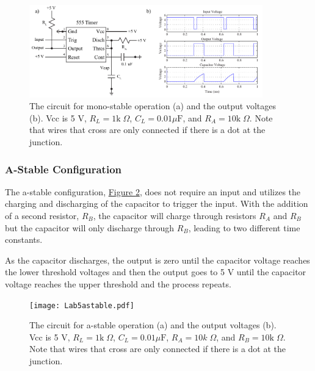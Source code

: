 \begin{figure}
	\centering
		\includegraphics[width=0.9\textwidth]{Lab5monostable.pdf}
	\caption{The circuit for mono-stable operation (a) and the output voltages (b). Vcc is 5 V, $R_L = 1\mathrm{k}\; \Omega$, $C_L = 0.01\mu \mathrm{F}$, and $R_A = 10\mathrm{k}\;\Omega$. Note that wires that cross are only connected if there is a dot at the junction.} \label{fig:monostable}
\end{figure}



\subsubsection{A-Stable Configuration}

The a-stable configuration, \hyperref[fig:astable]{Figure \ref*{fig:astable}}, does not require an input  and utilizes the charging and discharging of the capacitor to trigger the input. With the addition of a second resistor, $R_B$, the capacitor will charge through resistors $R_A$ and $R_B$ but the capacitor will only discharge through $R_B$, leading to two different time constants. 

As the capacitor discharges, the output is zero until the capacitor voltage reaches the lower threshold voltages and then the output goes to 5 V until the capacitor voltage reaches the upper threshold and the process repeats. 

\begin{figure}[h]
	\centering
		\texttt{[image: Lab5astable.pdf]}
	\caption{The circuit for a-stable operation (a) and the output voltages (b). Vcc is 5 V, $R_L = 1\mathrm{k}\; \Omega$, $C_L = 0.01\mu \mathrm{F}$, $R_A = 10k\;\Omega$, and $R_B = 10\mathrm{k}\;\Omega$. Note that wires that cross are only connected if there is a dot at the junction.} \label{fig:astable}
\end{figure}

